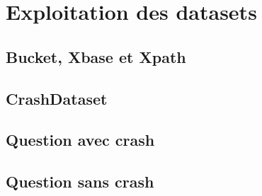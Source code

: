 \section{Exploitation des datasets}
\subsection{Bucket, Xbase et Xpath}
\subsection{CrashDataset}
\subsection{Question avec crash}
\subsection{Question sans crash}
